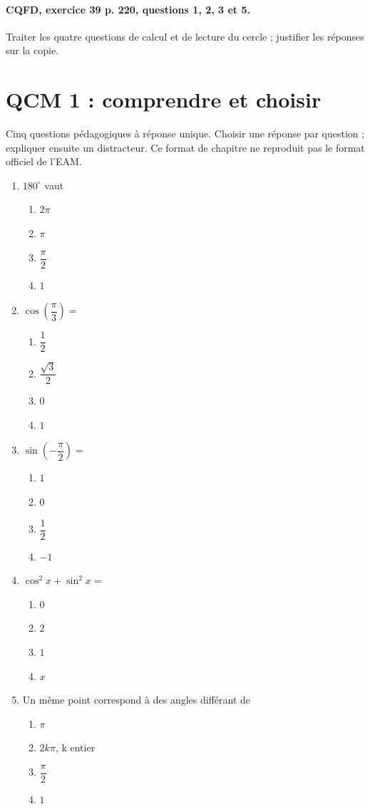 \paragraph{CQFD, exercice 39 p. 220, questions 1, 2, 3 et 5.}\label{C10-M2} Traiter les quatre questions de calcul et de lecture du cercle ; justifier les réponses sur la copie.
\begingroup\small
\clearpage\section*{QCM 1 : comprendre et choisir}\label{C10-Q1}
Cinq questions pédagogiques à réponse unique. Choisir une réponse par question ; expliquer ensuite un distracteur. Ce format de chapitre ne reproduit pas le format officiel de l’EAM.
\begin{enumerate}
\item $180^\circ$ vaut
\begin{enumerate}[label=\Alph*.,itemsep=2pt]
\item $2\pi$
\item $\pi$
\item $\dfrac{\pi}{2}$
\item $1$
\end{enumerate}
\item $\cos (\dfrac{\pi}{3})=$
\begin{enumerate}[label=\Alph*.,itemsep=2pt]
\item $\dfrac{1}{2}$
\item $\dfrac{\sqrt 3}{2}$
\item $0$
\item $1$
\end{enumerate}
\item $\sin (-\dfrac{\pi}{2})=$
\begin{enumerate}[label=\Alph*.,itemsep=2pt]
\item $1$
\item $0$
\item $\dfrac{1}{2}$
\item $-1$
\end{enumerate}
\item $\cos^2x+\sin^2x=$
\begin{enumerate}[label=\Alph*.,itemsep=2pt]
\item $0$
\item $2$
\item $1$
\item $x$
\end{enumerate}
\item Un même point correspond à des angles différant de
\begin{enumerate}[label=\Alph*.,itemsep=2pt]
\item $\pi$
\item $2k\pi$, k entier
\item $\dfrac{\pi}{2}$
\item $1$
\end{enumerate}
\end{enumerate}
